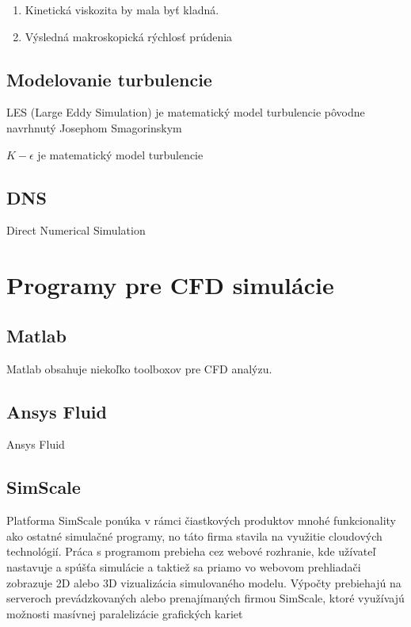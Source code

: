 \documentclass[]{tukediphc}
\begin{document}
\begin{enumerate}
	\item{Kinetická viskozita by mala byť kladná.}
	\item{Výsledná makroskopická rýchlosť prúdenia}
\end{enumerate}


\subsection{Modelovanie turbulencie}

LES (Large Eddy Simulation) je matematický model turbulencie pôvodne navrhnutý Josephom Smagorinskym


$K-\epsilon$ je matematický model turbulencie

\subsection{DNS}

Direct Numerical Simulation

\section{Programy pre CFD simulácie}

\subsection{Matlab}
Matlab obsahuje niekoľko toolboxov pre CFD analýzu. 

\subsection{Ansys Fluid}

Ansys Fluid

\subsection{SimScale}

Platforma SimScale ponúka v rámci čiastkových produktov mnohé funkcionality ako ostatné simulačné programy, no táto firma stavila na využitie cloudových technológií. Práca s programom prebieha cez webové rozhranie, kde užívateľ nastavuje a spúšťa simulácie a taktiež sa priamo vo webovom prehliadači zobrazuje 2D alebo 3D vizualizácia simulovaného modelu. Výpočty prebiehajú na serveroch prevádzkovaných alebo prenajímaných firmou SimScale, ktoré využívajú možnosti masívnej paralelizácie grafických kariet
\end{document}

